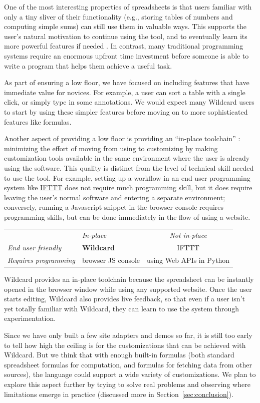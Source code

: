 \documentclass[english,submission]{programming}
\begin{document}
One of the most interesting properties of spreadsheets is that users
familiar with only a tiny sliver of their functionality (e.g., storing
tables of numbers and computing simple sums) can still use them in
valuable ways. This supports the user's natural motivation to continue
using the tool, and to eventually learn its more powerful features if
needed \autocite{nardi1991}. In contrast, many traditional programming
systems require an enormous upfront time investment before someone is
able to write a program that helps them achieve a useful task.

As part of ensuring a low floor, we have focused on including features
that have immediate value for novices. For example, a user can sort a
table with a single click, or simply type in some annotations. We would
expect many Wildcard users to start by using these simpler features
before moving on to more sophisticated features like formulas.

Another aspect of providing a low floor is providing an ``in-place
toolchain'' \autocite{2019}: minimizing the effort of moving from using
to customizing by making customization tools available in the same
environment where the user is already using the software. This quality
is distinct from the level of technical skill needed to use the tool.
For example, setting up a workflow in an end user programming system
like \href{https://ifttt.com/}{IFTTT} does not require much programming
skill, but it does require leaving the user's normal software and
entering a separate environment; conversely, running a Javascript
snippet in the browser console requires programming skills, but can be
done immediately in the flow of using a website.

\begin{longtable}[]{@{}llc@{}}
\toprule
\endhead
& \emph{In-place} & \emph{Not in-place}\tabularnewline
\emph{End user friendly} & \textbf{Wildcard} & IFTTT\tabularnewline
\emph{Requires programming} & browser JS console & using Web APIs in
Python\tabularnewline
\bottomrule
\end{longtable}

Wildcard provides an in-place toolchain because the spreadsheet can be
instantly opened in the browser window while using any supported
website. Once the user starts editing, Wildcard also provides live
feedback, so that even if a user isn't yet totally familiar with
Wildcard, they can learn to use the system through experimentation.

Since we have only built a few site adapters and demos so far, it is
still too early to tell how high the ceiling is for the customizations
that can be achieved with Wildcard. But we think that with enough
built-in formulas (both standard spreadsheet formulas for computation,
and formulas for fetching data from other sources), the language could
support a wide variety of customizations. We plan to explore this aspect
further by trying to solve real problems and observing where limitations
emerge in practice (discussed more in Section~\ref{sec:conclusion}).
\end{document}
